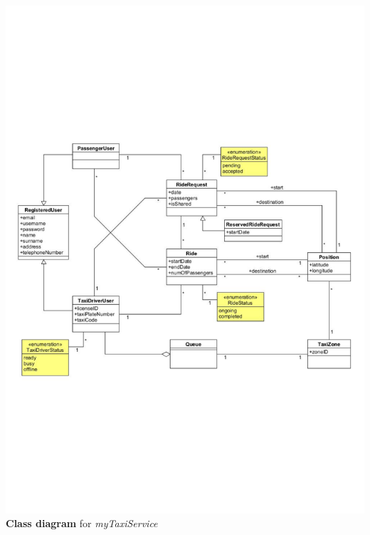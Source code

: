 \begin{center}
	\includegraphics[width=\textwidth]{diagrams/global_class_diagram}
	{\bf Class diagram} for {\it myTaxiService}
\end{center}
